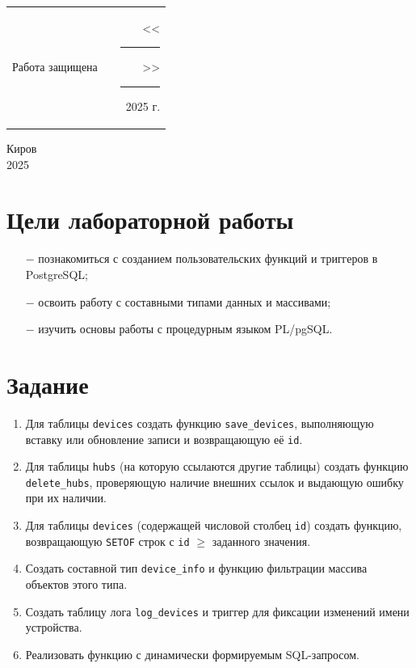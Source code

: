 \documentclass[oneside,a4paper,14pt]{extarticle}
\begin{document}
\noindent
\begin{tabular}{lp{58mm}r}
  Работа защищена &  & \hspace{13mm}<<\rule[-1mm]{5mm}{0.10mm}\/>>\rule[-1mm]{30mm}{0.10mm}\ 2025 г.
\end{tabular}
\vfill

\begin{center}
  Киров\\
  2025
\end{center}

\newpage\thispagestyle{plain}

\section*{Цели лабораторной работы}
\begin{itemize}
  \item[$-$] познакомиться с созданием пользовательских функций и триггеров в PostgreSQL;
  \item[$-$] освоить работу с составными типами данных и массивами;
  \item[$-$] изучить основы работы с процедурным языком PL/pgSQL.
\end{itemize}

\section*{Задание}
\begin{enumerate}
  \item Для таблицы \texttt{devices} создать функцию \texttt{save\_devices}, выполняющую вставку или обновление записи и возвращающую её \texttt{id}.
  \item Для таблицы \texttt{hubs} (на которую ссылаются другие таблицы) создать функцию \texttt{delete\_hubs}, проверяющую наличие внешних ссылок и выдающую ошибку при их наличии.
  \item Для таблицы \texttt{devices} (содержащей числовой столбец \texttt{id}) создать функцию, возвращающую \texttt{SETOF} строк с \texttt{id} $\geq$ заданного значения.
  \item Создать составной тип \texttt{device\_info} и функцию фильтрации массива объектов этого типа.
  \item Создать таблицу лога \texttt{log\_devices} и триггер для фиксации изменений имени устройства.
  \item Реализовать функцию с динамически формируемым SQL-запросом.
\end{enumerate}
\end{document}
